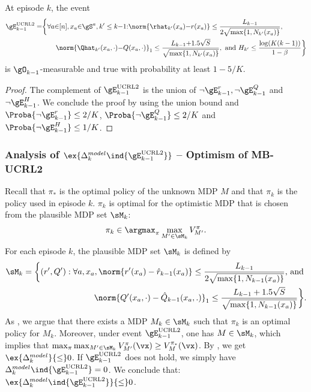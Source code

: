 \begin{subappendices}
\begin{lem}
    \label{lem:concentration_ucrl}
    At episode $k$, the event
    \begin{align*}
        \gE^\text{UCRL2}_{k-1} =&\bigg\{ \forall a{\in}[n], x_a{\in}\gS^a, k'\le k{-}1{:}
            \norm{\rhat_{k'}(x_a){-}r(x_a)} \le\frac{L_{k-1}}{2\sqrt{\max\{1,N_{k'}(x_a)\} }}, \\
            &\qquad\norm{\Qhat_{k'}(x_a,\cdot) {-}Q(x_a,\cdot)}_1 \le\frac{L_{k-1}{+}1.5\sqrt{S}}{\sqrt{\max\{1,N_{k'}(x_a)\} }}, \text{ and } H_{k'}\le \frac{\log(K(k-1))}{1-\beta} \bigg\}
    \end{align*}
    is $\gO_{k-1}$-measurable and true with probability at least $1-5/K$.
\end{lem}
\begin{proof}
    The complement of $\gE_{k-1}^\text{UCRL2}$ is the union of $\neg \gE_{k-1}^r, \neg \gE_{k-1}^Q$ and $\neg \gE_{k-1}^H$. We conclude the proof by using the union bound and $\Proba{\neg \gE_{k-1}^r} \le 2/K$, $\Proba{\neg \gE_{k-1}^Q} \le 2/K$ and $\Proba{\neg \gE_{k-1}^H} \le 1/K$. 
\end{proof}

\subsubsection{Analysis of $\ex{\Delta^{model}_k\ind{\gE_{k-1}^\text{UCRL2}}}$ -- Optimism of MB-UCRL2}

Recall that $\pi_*$ is the optimal policy of the unknown MDP $M$ and that $\pi_k$ is the policy used in episode $k$. $\pi_k$ is optimal for the optimistic MDP that is chosen from the plausible MDP set $\sM_k$:
\begin{align*}
    \pi_k \in \argmax_{\pi} \max_{M'\in\sM_k} V^\pi_{M'}.
\end{align*}
For each episode $k$, the plausible MDP set $\sM_k$ is defined by
\begin{align}
    \label{eq:plausible}
    \sM_k=\bigg\{(r',Q'):\forall a, x_a, \norm{r'(x_a)-\hat{r}_{k-1}(x_a)} \le \frac{L_{k-1}}{2\sqrt{\max\{1,N_{k-1}(x_a)\} }} \text{, and }\nonumber\\
    \norm{Q'(x_a,\cdot)-\hat{Q}_{k-1}(x_a, .)}_1 \le \frac{L_{k-1}+1.5\sqrt{S}}{\sqrt{\max\{1,N_{k-1}(x_a)\} }}\bigg\}.
\end{align}
As \cite{jaksch2010near}, we argue that there exists a MDP $M_k\in\sM_k$ such that $\pi_k$ is an optimal policy for $M_k$. Moreover, under event $\gE^\text{UCRL2}_{k-1}$, one has $M\in \sM_k$, which implies that $\max_{\pi}\max_{M'\in \sM_k} V^{\pi}_{M'}(\vx)\ge V^{\pi_*}_M(\vx)$. By , we get $\ex{\Delta^{model}_k}{\le} 0$.
If $\gE^\text{UCRL2}_{k-1}$ does not hold, we simply have $\Delta^{model}_k\ind{\gE_{k-1}^\text{UCRL2}}=0$. We conclude that: $\ex{\Delta^{model}_k\ind{\gE^\text{UCRL2}_{k-1}}}{\le}0$. 



\end{subappendices}
